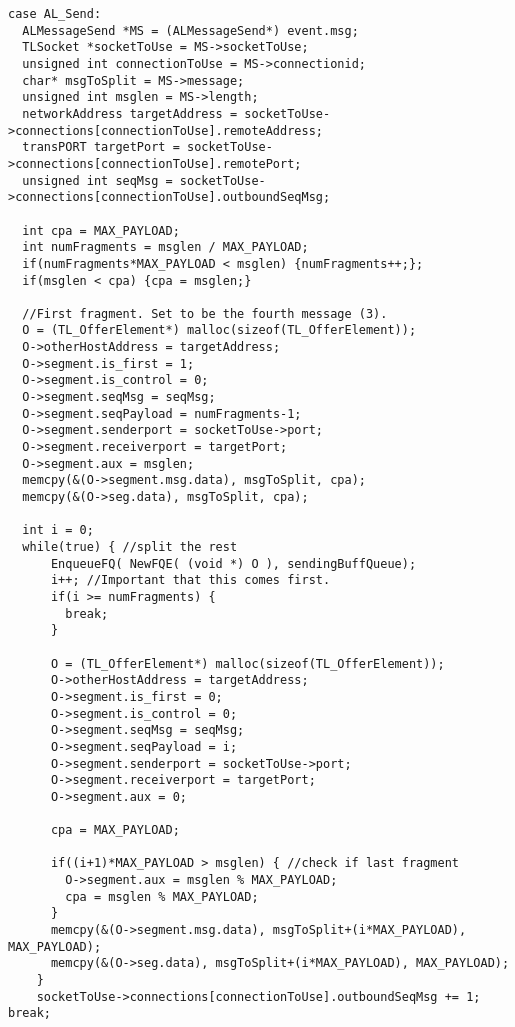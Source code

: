 \begin{lstlisting}
case AL_Send:
  ALMessageSend *MS = (ALMessageSend*) event.msg;
  TLSocket *socketToUse = MS->socketToUse;
  unsigned int connectionToUse = MS->connectionid;
  char* msgToSplit = MS->message;
  unsigned int msglen = MS->length;
  networkAddress targetAddress = socketToUse->connections[connectionToUse].remoteAddress;
  transPORT targetPort = socketToUse->connections[connectionToUse].remotePort;
  unsigned int seqMsg = socketToUse->connections[connectionToUse].outboundSeqMsg;

  int cpa = MAX_PAYLOAD;
  int numFragments = msglen / MAX_PAYLOAD;
  if(numFragments*MAX_PAYLOAD < msglen) {numFragments++;};
  if(msglen < cpa) {cpa = msglen;}

  //First fragment. Set to be the fourth message (3).
  O = (TL_OfferElement*) malloc(sizeof(TL_OfferElement));
  O->otherHostAddress = targetAddress;
  O->segment.is_first = 1;
  O->segment.is_control = 0;
  O->segment.seqMsg = seqMsg;
  O->segment.seqPayload = numFragments-1;
  O->segment.senderport = socketToUse->port;
  O->segment.receiverport = targetPort;
  O->segment.aux = msglen;
  memcpy(&(O->segment.msg.data), msgToSplit, cpa);
  memcpy(&(O->seg.data), msgToSplit, cpa);

  int i = 0;
  while(true) { //split the rest
      EnqueueFQ( NewFQE( (void *) O ), sendingBuffQueue);
      i++; //Important that this comes first.
      if(i >= numFragments) {
        break;
      }

      O = (TL_OfferElement*) malloc(sizeof(TL_OfferElement));
      O->otherHostAddress = targetAddress;
      O->segment.is_first = 0;
      O->segment.is_control = 0;
      O->segment.seqMsg = seqMsg;
      O->segment.seqPayload = i;
      O->segment.senderport = socketToUse->port;
      O->segment.receiverport = targetPort;
      O->segment.aux = 0;

      cpa = MAX_PAYLOAD;

      if((i+1)*MAX_PAYLOAD > msglen) { //check if last fragment
        O->segment.aux = msglen % MAX_PAYLOAD;
        cpa = msglen % MAX_PAYLOAD;
      }
      memcpy(&(O->segment.msg.data), msgToSplit+(i*MAX_PAYLOAD), MAX_PAYLOAD);
      memcpy(&(O->seg.data), msgToSplit+(i*MAX_PAYLOAD), MAX_PAYLOAD);
    }
    socketToUse->connections[connectionToUse].outboundSeqMsg += 1;
break;
\end{lstlisting}

